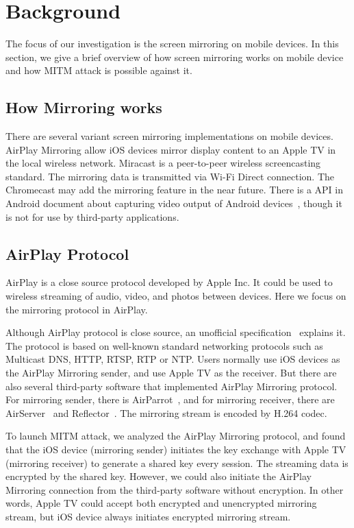 \chapter{Background}

The focus of our investigation is the screen mirroring on mobile devices. In this section, we give a brief overview of how screen mirroring works on mobile device and how MITM attack is possible against it.

\section{How Mirroring works}

There are several variant screen mirroring implementations on mobile devices. AirPlay Mirroring allow iOS devices mirror display content to an Apple TV in the local wireless network. Miracast is a peer-to-peer wireless screencasting standard. The mirroring data is transmitted via Wi-Fi Direct connection. The Chromecast may add the mirroring feature in the near future. There is a API in Android document about capturing video output of Android devices~\cite{CAPTUREVIDEOOUTPUT}, though it is not for use by third-party applications.

\section{AirPlay Protocol}

AirPlay is a close source protocol developed by Apple Inc. It could be used to wireless streaming of audio, video, and photos between devices. Here we focus on the mirroring protocol in AirPlay.

Although AirPlay protocol is close source, an unofficial specification~\cite{unofficial} explains it. The protocol is based on well-known standard networking protocols such as Multicast DNS, HTTP, RTSP, RTP or NTP. Users normally use iOS devices as the AirPlay Mirroring sender, and use Apple TV as the receiver. But there are also several third-party software that implemented AirPlay Mirroring protocol. For mirroring sender, there is AirParrot~\cite{AirParrot}, and for mirroring receiver, there are AirServer~\cite{AirServer} and Reflector~\cite{Reflector}. The mirroring stream is encoded by H.264 codec.

To launch MITM attack, we analyzed the AirPlay Mirroring protocol, and found that the iOS device (mirroring sender) initiates the key exchange with Apple TV (mirroring receiver) to generate a shared key every session. The streaming data is encrypted by the shared key. However, we could also initiate the AirPlay Mirroring connection from the third-party software without encryption. In other words, Apple TV could accept both encrypted and unencrypted mirroring stream, but iOS device always initiates encrypted mirroring stream.

